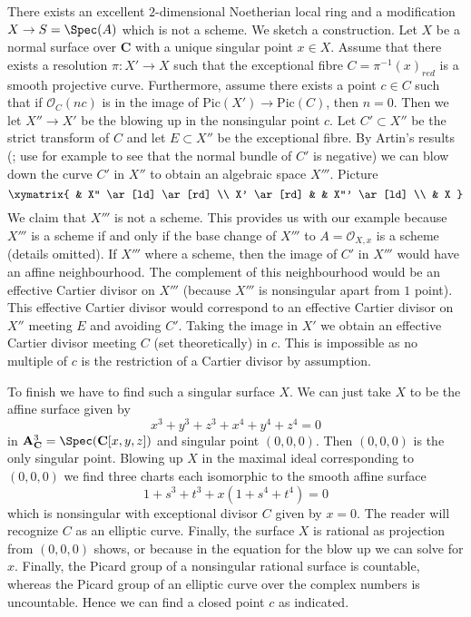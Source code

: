 \begin{example}
\label{example-not-blow-up}
There exists an excellent $2$-dimensional Noetherian local ring
and a modification $X \to S = \Spec(A)$ which is not a scheme.
We sketch a construction. Let $X$ be a normal surface over $\mathbf{C}$
with a unique singular point $x \in X$. Assume that there exists a
resolution $\pi : X' \to X$ such that the exceptional fibre
$C = \pi^{-1}(x)_{red}$ is a smooth projective curve. Furthermore, assume
there exists a point $c \in C$ such that if $\mathcal{O}_C(nc)$
is in the image of $\text{Pic}(X') \to \text{Pic}(C)$, then $n = 0$.
Then we let $X'' \to X'$ be the blowing up in the nonsingular point $c$.
Let $C' \subset X''$ be the strict transform of $C$ and let $E \subset X''$
be the exceptional fibre. By Artin's results
(\cite{ArtinII}; use for example \cite{Mumford-topology}
to see that the normal bundle of $C'$ is negative)
we can blow down the curve $C'$ in $X''$ to obtain an algebraic space $X'''$.
Picture
$$
\xymatrix{
& X'' \ar[ld] \ar[rd] \\
X' \ar[rd] &  & X''' \ar[ld] \\
& X
}
$$
We claim that $X'''$ is not a scheme. This provides us with our example
because $X'''$ is a scheme if and only if the base change of $X'''$
to $A = \mathcal{O}_{X, x}$ is a scheme (details omitted).
If $X'''$ where a scheme, then the image of $C'$ in $X'''$ would
have an affine neighbourhood. The complement of this neighbourhood
would be an effective Cartier divisor on $X'''$ (because $X'''$ is
nonsingular apart from $1$ point). This effective Cartier divisor would
correspond to an effective Cartier divisor on $X''$
meeting $E$ and avoiding $C'$. Taking the image in $X'$ we obtain
an effective Cartier divisor meeting $C$ (set theoretically) in $c$.
This is impossible as no multiple of $c$ is the restriction of a Cartier
divisor by assumption.

\medskip\noindent
To finish we have to find such a singular surface $X$. We can just take
$X$ to be the affine surface given by
$$
x^3 + y^3 + z^3 + x^4 + y^4 + z^4 = 0
$$
in $\mathbf{A}^3_\mathbf{C} = \Spec(\mathbf{C}[x, y, z])$ and singular point
$(0, 0, 0)$. Then $(0, 0, 0)$ is the only singular point. Blowing up $X$
in the maximal ideal corresponding to $(0, 0, 0)$ we find three charts each
isomorphic to the smooth affine surface
$$
1 + s^3 + t^3 + x(1 + s^4 + t^4) = 0
$$
which is nonsingular with exceptional divisor $C$ given by $x = 0$. The reader
will recognize $C$ as an elliptic curve. Finally, the surface $X$ is rational
as projection from $(0, 0, 0)$ shows, or because in the equation for the
blow up we can solve for $x$. Finally, the Picard group of a nonsingular
rational surface is countable, whereas the Picard group of an elliptic
curve over the complex numbers is uncountable. Hence we can find a closed
point $c$ as indicated.
\end{example}














